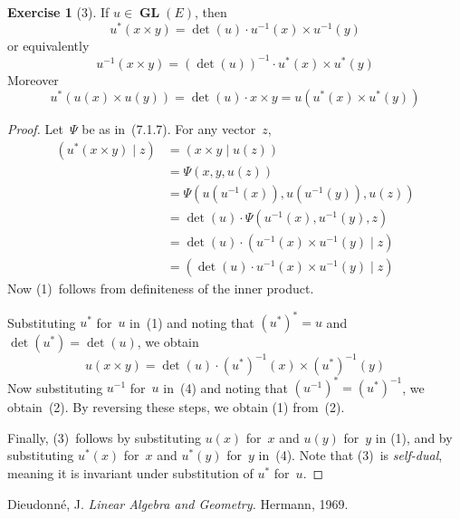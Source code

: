 \documentclass[letterpaper,12pt]{article}
\newcommand{\mult}{\cdot}
\newcommand{\cross}{\times}
\DeclareMathOperator{\GL}{\mathbf{GL}}
\newcommand{\inv}[1]{#1^{-1}}
\newcommand{\innerprod}[2]{({#1}\;|\;{#2})}
\newcommand{\adj}[1]{#1^*}
\theoremstyle{definition}
\newtheorem*{exer}{Exercise}
\theoremstyle{remark}
\begin{document}
\begin{exer}[3]
If \(u\in\GL(E)\), then
\[\adj{u}(x\cross y)=\det(u)\mult\inv{u}(x)\cross\inv{u}(y)\tag{1}\]
or equivalently
\[\inv{u}(x\cross y)=(\det(u))^{-1}\mult\adj{u}(x)\cross\adj{u}(y)\tag{2}\]
Moreover
\[\adj{u}(u(x)\cross u(y))=\det(u)\mult x\cross y=u(\adj{u}(x)\cross\adj{u}(y))\tag{3}\]
\end{exer}
\begin{proof}
Let~\(\Psi\) be as in~(7.1.7). For any vector~\(z\),
\begin{align*}
\innerprod{\adj{u}(x\cross y)}{z}&=\innerprod{x\cross y}{u(z)}\\
	&=\Psi(x,y,u(z))\\
	&=\Psi(u(\inv{u}(x)),u(\inv{u}(y)),u(z))\\
	&=\det(u)\mult\Psi(\inv{u}(x),\inv{u}(y),z)\\
	&=\det(u)\mult\innerprod{\inv{u}(x)\cross\inv{u}(y)}{z}\\
	&=\innerprod{\det(u)\mult\inv{u}(x)\cross\inv{u}(y)}{z}
\end{align*}
Now (1)~follows from definiteness of the inner product.

Substituting \(\adj{u}\) for~\(u\) in~(1) and noting that \(\adj{(\adj{u})}=u\) and \(\det(\adj{u})=\det(u)\), we obtain
\[u(x\cross y)=\det(u)\mult\inv{(\adj{u})}(x)\cross\inv{(\adj{u})}(y)\tag{4}\]
Now substituting \(\inv{u}\) for~\(u\) in~(4) and noting that \(\adj{(\inv{u})}=\inv{(\adj{u})}\), we obtain~(2). By reversing these steps, we obtain (1) from~(2).

Finally, (3)~follows by substituting \(u(x)\) for~\(x\) and \(u(y)\) for~\(y\) in (1), and by substituting \(\adj{u}(x)\) for~\(x\) and \(\adj{u}(y)\) for~\(y\) in~(4). Note that (3)~is \emph{self-dual}, meaning it is invariant under substitution of \(\adj{u}\) for~\(u\).
\end{proof}

\begin{thebibliography}{0}
 Dieudonn\'e, J. \textit{Linear Algebra and Geometry.} Hermann, 1969.
\end{thebibliography}
\end{document}
